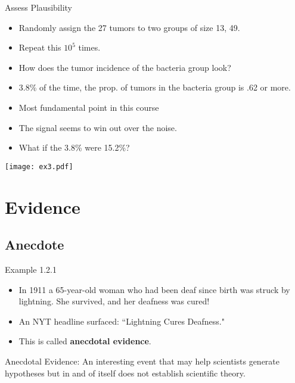 \documentclass{beamer}
\begin{document}
\begin{frame}{Assess Plausibility}
\begin{itemize}
  \item Randomly assign the 27 tumors to two groups of size 13, 49.
  \item Repeat this $10^5$ times.
  \item How does the tumor incidence of the bacteria group look?
\pause
  \item 3.8\% of the time, the prop. of tumors in the bacteria group is .62 or more.
  \item Most fundamental point in this course
  \item The signal seems to win out over the noise.
\pause
  \item What if the 3.8\% were 15.2\%?
\end{itemize}
\end{frame}

\begin{frame}[plain]
  \texttt{[image: ex3.pdf]}
\end{frame}



\section{Evidence}

\subsection{Anecdote}

\begin{frame}{Example 1.2.1}
\begin{itemize}
  \item In 1911 a 65-year-old woman who had been deaf since birth was struck by lightning.  She survived, and her deafness was cured!
  \item An NYT headline surfaced: ``Lightning Cures Deafness."
  \item This is called \textbf{anecdotal evidence}.
\end{itemize}
\pause
\begin{block}{Anecdotal Evidence:} An interesting event that may help scientists generate hypotheses but in and of itself does not establish scientific theory.
\end{block}

\end{frame}
\end{document}
